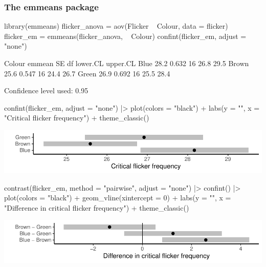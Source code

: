 \documentclass[a4paper]{article}
\begin{document}
\subsubsection{The emmeans package}
\begin{Schunk}
\begin{Sinput}
library(emmeans)
flicker_anova = aov(Flicker ~ Colour, data = flicker)
flicker_em = emmeans(flicker_anova, ~ Colour)
confint(flicker_em, adjust = "none")
\end{Sinput}
\begin{Soutput}
 Colour emmean    SE df lower.CL upper.CL
 Blue     28.2 0.632 16     26.8     29.5
 Brown    25.6 0.547 16     24.4     26.7
 Green    26.9 0.692 16     25.5     28.4

Confidence level used: 0.95 
\end{Soutput}
\begin{Sinput}
confint(flicker_em, adjust = "none") |> plot(colors = "black") + 
  labs(y = "", x = "Critical flicker frequency") +
  theme_classic()
\end{Sinput}


{\centering \includegraphics[width=\maxwidth]{figure/listings-unnamed-chunk-246-1} 

}

\begin{Sinput}
contrast(flicker_em, method = "pairwise", adjust = "none") |> confint()  |> 
  plot(colors = "black") + geom_vline(xintercept = 0) + 
  labs(y = "", x = "Difference in critical flicker frequency") +
  theme_classic()
\end{Sinput}


{\centering \includegraphics[width=\maxwidth]{figure/listings-unnamed-chunk-246-2} 

}

\end{Schunk}
\end{document}
